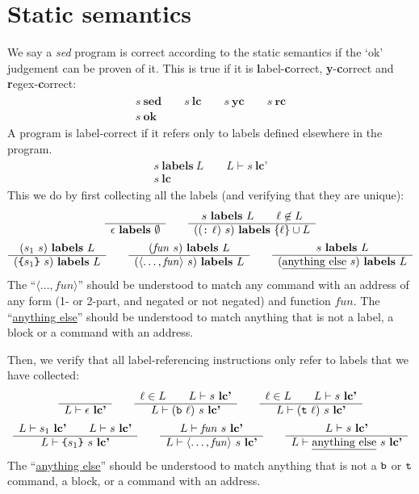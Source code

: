 \documentclass[11pt]{article}
\newcommand\SED{\emph{sed}}
\newcommand\RULE[3][]{\begin{array}{c} #2 \\ \hline #3 \end{array}}
\newcommand\J[1]{\ensuremath{\textbf{#1}}}
\newcommand\cmd[1]{\ensuremath{\text{\texttt{#1}}}}
\renewcommand\arg[1]{\ensuremath{\mathit{#1}}}
\newcommand\angles[1]{\langle #1 \rangle}
\begin{document}
\section{Static semantics}

We say a \SED{} program is correct according to the static semantics if the `ok' judgement can be proven of it.
This is true if it is \textbf{l}abel-\textbf{c}orrect, \textbf{y}-\textbf{c}orrect and \textbf{r}egex-\textbf{c}orrect:
\begin{gather*}
	\RULE{s\ \J{sed} \qquad s\ \J{lc} \qquad s\ \J{yc} \qquad s\ \J{rc}}{s\ \J{ok}}
\end{gather*}
%
A program is label-correct if it refers only to labels defined elsewhere in the program.
\begin{gather*}
	\RULE{s\ \J{labels}\ L \qquad L \vdash s\ \J{lc'}}{s\ \J{lc}}
\end{gather*}
%
This we do by first collecting all the labels (and verifying that they are unique):
\begin{gather*}
	\RULE{}{\epsilon\ \J{labels}\ \emptyset} \qquad
	\RULE{s\ \J{labels}\ L \qquad \ell \not\in L}{((\cmd{:}\ \ell)\ s)\ \J{labels}\ \{\ell\} \cup L} \\
%
	\RULE{(s_1\ s)\ \J{labels}\ L}{(\cmd{\{} s_1 \cmd{\}}\ s)\ \J{labels}\ L} \qquad
	\RULE{(\arg{fun}\ s)\ \J{labels}\ L}{(\angles{\ldots, \arg{fun}}\ s)\ \J{labels}\ L} \qquad
	\RULE{s\ \J{labels}\ L}{(\text{\underline{anything else}}\ s)\ \J{labels}\ L}
\end{gather*}
The ``$\angles{\ldots, \arg{fun}}$'' should be understood to match any command with an address of any form (1- or 2-part, and negated or not negated) and function \arg{fun}.
The ``\underline{anything else}'' should be understood to match anything that is not a label, a block or a command with an address.

Then, we verify that all label-referencing instructions only refer to labels that we have collected:
\begin{gather*}
	\RULE{}{L \vdash \epsilon\ \J{lc'}} \qquad
	\RULE{\ell \in L \qquad L \vdash s\ \J{lc'}}{L \vdash (\cmd{b}\ \ell)\ s\ \J{lc'}} \qquad
	\RULE{\ell \in L \qquad L \vdash s\ \J{lc'}}{L \vdash (\cmd{t}\ \ell)\ s\ \J{lc'}} \\
%
	\RULE{L \vdash s_1\ \J{lc'} \qquad L \vdash s\ \J{lc'}}{L \vdash \cmd{\{} s_1 \cmd{\}}\ s\ \J{lc'}} \qquad
	\RULE{L \vdash \arg{fun}\ s\ \J{lc'}}{L \vdash \angles{\ldots, \arg{fun}}\ s\ \J{lc'}} \qquad
	\RULE{L \vdash s\ \J{lc'}}{L \vdash \text{\underline{anything else}}\ s\ \J{lc'}}
\end{gather*}
The ``\underline{anything else}'' should be understood to match anything that is not a \cmd{b} or \cmd{t} command, a block, or a command with an address.
\end{document}
